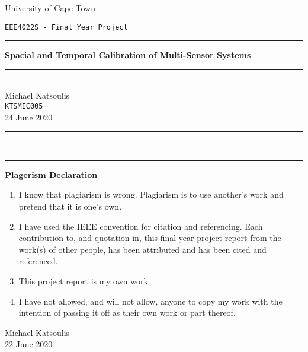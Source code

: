 \documentclass[BCOR13mm,DIV15]{scrartcl}
\begin{document}
\begin{titlepage}
    \setlength{\parindent}{0pt}
    \setlength{\parskip}{0pt}
    \begin{center}
        \vspace{-4cm}
        \huge University of Cape Town
    \end{center}
    \vspace{2.5cm}
    \begin{flushleft}
        \large \texttt{EEE4022S - Final Year Project}\\[8pt]
    \end{flushleft}

    \rule{\linewidth}{0.5pt}
    \begin{center}
    \vspace{10pt}
    \huge \textbf{Spacial and Temporal Calibration of Multi-Sensor Systems}\\[5pt]
    \rule{\linewidth}{0.5pt} \\[25pt]
    \LARGE Michael Katsoulis\\[5pt]
    \large \texttt{KTSMIC005} \\[1cm]
    24 June 2020\\ %
    \rule{5cm}{0.5pt}\\[-5pt]
    \rule{2.7cm}{0.5pt}
    \end{center}
    \Large{ \textbf{Plagerism Declaration}}

    \hrulefill
    \normalsize
    \begin{enumerate}
        \item I  know that  plagiarism is wrong. Plagiarism  is  to use  another's  work  and  pretend that  it is one's own.
        \item I  have  used  the IEEE convention  for  citation  and  referencing.  Each  contribution  to,  and quotation  in,  this final  year  project  report from  the  work(s)  of  other  people,  has  been attributed and has been cited and referenced.
        \item This project report is my own work.
        \item I have not allowed, and will not allow, anyone to copy my work with the intention of passing it off as their own work or part thereof.
    \end{enumerate}
    \begin{flushright}
        Michael Katsoulis\\
        22 June 2020
    \end{flushright}
    \hrulefill
\end{titlepage}
\end{document}
